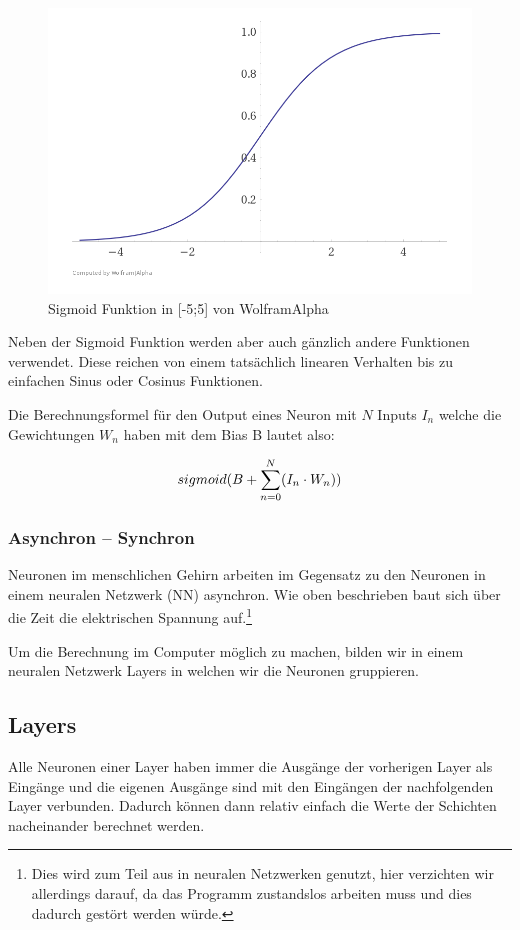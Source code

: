\documentclass[11pt, twocolumn]{article}
\begin{document}
\begin{figure}
	\includegraphics[width=\linewidth]{Sigmoid.png}
	\caption{Sigmoid Funktion in [-5;5] von WolframAlpha}
	\label{fig:sigmoid}
\end{figure}

Neben der Sigmoid Funktion werden aber auch gänzlich andere Funktionen verwendet. Diese reichen von einem tatsächlich linearen Verhalten bis zu einfachen Sinus oder Cosinus Funktionen.

Die Berechnungsformel für den Output eines Neuron mit $N$ Inputs $I_n$ welche die Gewichtungen $W_n$ haben mit dem Bias B lautet also:

\begin{equation}
	\centering
	sigmoid(B + \sum_{n=0}^{N}(I_n \cdot W_n))
\end{equation}
 
\subsubsection{Asynchron – Synchron}
Neuronen im menschlichen Gehirn arbeiten im Gegensatz zu den Neuronen in einem neuralen Netzwerk (NN) asynchron. Wie oben beschrieben baut sich über die Zeit die elektrischen Spannung auf.\footnote{Dies wird zum Teil aus in neuralen Netzwerken genutzt, hier verzichten wir allerdings darauf, da das Programm zustandslos arbeiten muss und dies dadurch gestört werden würde.}

Um die Berechnung im Computer möglich zu machen, bilden wir in einem neuralen Netzwerk Layers in welchen wir die Neuronen gruppieren.


\subsection{Layers}
Alle Neuronen einer Layer haben immer die Ausgänge der vorherigen Layer als Eingänge und die eigenen Ausgänge sind mit den Eingängen der nachfolgenden Layer verbunden. Dadurch können dann relativ einfach die Werte der Schichten nacheinander berechnet werden.
\end{document}
